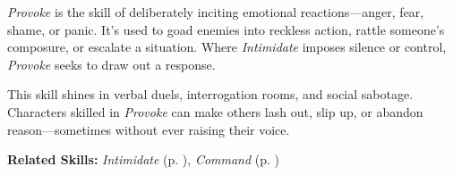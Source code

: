 \emph{Provoke} is the skill of deliberately inciting emotional reactions—anger, fear, shame, or panic. It’s used to goad enemies into reckless action, rattle someone’s composure, or escalate a situation. Where \emph{Intimidate} imposes silence or control, \emph{Provoke} seeks to draw out a response.

This skill shines in verbal duels, interrogation rooms, and social sabotage. Characters skilled in \emph{Provoke} can make others lash out, slip up, or abandon reason—sometimes without ever raising their voice.

\vspace{0.5\baselineskip}
\noindent\textbf{Related Skills:} \emph{Intimidate} (p. \pageref{skill:intimidate}), \emph{Command} (p. \pageref{skill:command})


